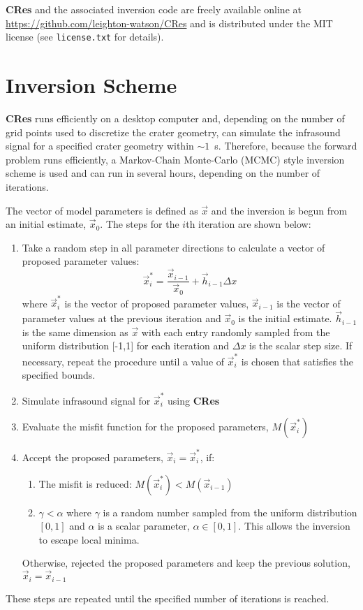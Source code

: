 \documentclass[10pt]{article}
\begin{document}
{\bf CRes} and the associated inversion code are freely available online at \href{https://github.com/leighton-watson/CRes}{https://github.com/leighton-watson/CRes} and is distributed under the MIT license (see \texttt{license.txt} for details). 

\section{Inversion Scheme}
{\bf CRes} runs efficiently on a desktop computer and,  depending on the number of grid points used to discretize the crater geometry, can simulate the infrasound signal for a specified crater geometry within $\sim1$~s. Therefore, because the forward problem runs efficiently, a Markov-Chain Monte-Carlo (MCMC) style inversion scheme is used and can run in several hours, depending on the number of iterations. 

The vector of model parameters is defined as $\vec{x}$ and the inversion is begun from an initial estimate, $\vec{x}_0$. The steps for the $i$th iteration are shown below:
\begin{enumerate}
    \item Take a random step in all parameter directions to calculate a vector of proposed parameter values:
    \begin{equation}
        \vec{x}_{i}^* = \frac{\vec{x}_{i-1}}{\vec{x}_0} + \vec{h}_{i-1} \Delta x
        \label{eq:inversion step}
    \end{equation}
    where $\vec{x}_{i}^*$ is the vector of proposed parameter values, $\vec{x}_{i-1}$ is the vector of parameter values at the previous iteration and $\vec{x}_0$ is the initial estimate. $\vec{h}_{i-1}$ is the same dimension as $\vec{x}$ with each entry randomly sampled from the uniform distribution [-1,1] for each iteration and $\Delta x$ is the scalar step size. If necessary, repeat the procedure until a value of $\vec{x}_{i}^*$ is chosen that satisfies the specified bounds. 
    \item Simulate infrasound signal for $\vec{x}_{i}^*$ using {\bf CRes}
    \item Evaluate the misfit function for the proposed parameters, $M(\vec{x}_{i}^*)$
    \item Accept the proposed parameters, $\vec{x}_{i} = \vec{x}_{i}^*$, if:
    \begin{enumerate}
        \item The misfit is reduced: $M(\vec{x}_{i}^*) < M(\vec{x}_{i-1})$
        \item $\gamma < \alpha$ where $\gamma$ is a random number sampled from the uniform distribution $[0,1]$ and $\alpha$ is a scalar parameter, $\alpha \in [0, 1]$. This allows the inversion to escape local minima.
    \end{enumerate}
    Otherwise, rejected the proposed parameters and keep the previous solution, $\vec{x}_{i} = \vec{x}_{i-1}$
\end{enumerate}
These steps are repeated until the specified number of iterations is reached.
\end{document}
